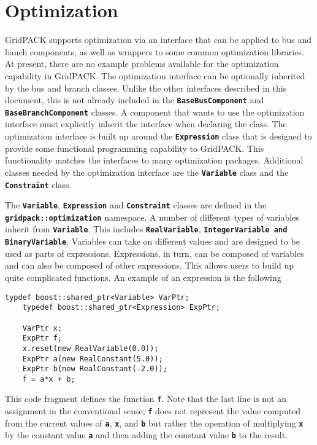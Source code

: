 \chapter{Optimization}

GridPACK supports optimization via an interface that can be applied to bus and banch components, as well as wrappers to some common optimization libraries. At present, there are no example problems available for the optimization capability in GridPACK.
The optimization interface can be optionally inherited by the bus and branch classes. Unlike the other interfaces described in this document, this is not already included in the \texttt{\textbf{BaseBusComponent}} and \texttt{\textbf{BaseBranchComponent}} classes. A component that wants to use the optimization interface must explicitly inherit the interface when declaring the class. The optimization interface is built up around the \texttt{\textbf{Expression}} class that is designed to provide some functional programming capability to GridPACK. This functionality matches the interfaces to many optimization packages. Additional classes needed by the optimization interface are the \texttt{\textbf{Variable}} class and the \texttt{\textbf{Constraint}} class.

The \texttt{\textbf{Variable}}, \texttt{\textbf{Expression}} and \texttt{\textbf{Constraint}} classes are defined in the \texttt{\textbf{gridpack::optimization}} namespace. A number of different types of variables inherit from \texttt{\textbf{Variable}}. This includes \texttt{\textbf{RealVariable}}, \texttt{\textbf{IntegerVariable and BinaryVariable}}. Variables can take on different values and are designed to be used as parts of expressions. Expressions, in turn, can be composed of variables and can also be composed of other expressions. This allows users to build up quite complicated functions. An example of an expression is the following

{
\color{red}
\begin{Verbatim}[fontseries=b]
    typdef boost::shared_ptr<Variable> VarPtr;
    typedef boost::shared_ptr<Expression> ExpPtr;

    VarPtr x;
    ExpPtr f;
    x.reset(new RealVariable(0.0));
    ExpPtr a(new RealConstant(5.0));
    ExpPtr b(new RealConstant(-2.0));
    f = a*x + b;
\end{Verbatim}
}

This code fragment defines the function \texttt{\textbf{f}}. Note that the last line is not an assignment in the conventional sense; \texttt{\textbf{f}} does not represent the value computed from the current values of \texttt{\textbf{a}}, \texttt{\textbf{x}}, and \texttt{\textbf{b}} but rather the operation of multiplying \texttt{\textbf{x}} by the constant value \texttt{\textbf{a}} and then adding the constant value \texttt{\textbf{b}} to the result.


